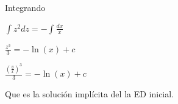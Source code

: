 \documentclass{article}
\theoremstyle{plain}
\theoremstyle{definition}
\begin{document}
Integrando


\begin{center}
$\displaystyle   \int z^2dz =- \int\frac{dx}{x} $
\end{center}

\begin{center}
$\displaystyle   \frac{z^3}{3} =-\ln(x) +c $
\end{center}

\begin{center}
$\displaystyle   \frac{\left(\frac{y}{x}\right)^3}{3} =-\ln(x) +c $
\end{center}


Que es la solución implícita del la ED inicial.
\end{document}
